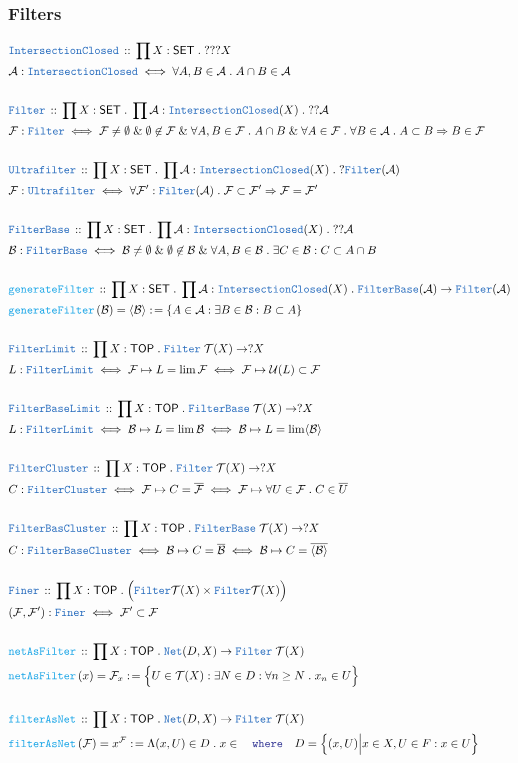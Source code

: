 \documentclass[12pt]{scrartcl}
\newcommand{\TYPE}[1]{\textcolor{NavyBlue}{\mathtt{#1}}}
\newcommand{\FUNC}[1]{\textcolor{Cerulean}{\mathtt{#1}}}
\newcommand{\LOGIC}[1]{\textcolor{Blue}{\mathtt{#1}}}
\renewcommand{\.}{\; . \;}
\newcommand{\de}{: \kern 0.1pc =}
\newcommand{\where}{\LOGIC{where}}
\newcommand{\Act}[1]{\left( #1 \right)}
\newcommand{\DeclareType}[2]{& \TYPE{#1} \, :: \, #2 \\}
\newcommand{\DefineType}[3]{& #1 : \TYPE{#2} \iff #3 \\}
\newcommand{\DefineNamedType}[4]{& #1 : \TYPE{#2} \iff #3 \iff #4 \\}
\newcommand{\DeclareFunc}[2]{& \FUNC{#1} \, :: \, #2 \\}
\newcommand{\DefineNamedFunc}[4]{&  \FUNC{#1}\Act{#2} = #3 \de #4 \\}
\newcommand{\Page}[1]{ \begin{align*} #1 \end{align*}   }
\renewcommand{\And}{\; \& \;}
\newcommand{\Imply}{\Rightarrow}
\newcommand{\A}{\mathcal{A}}
\newcommand{\B}{\mathcal{B}}
\newcommand{\SET}{\mathsf{SET}}
\newcommand{\TOP}{\mathsf{TOP}}
\newcommand{\T}{\mathcal{T}}
\renewcommand{\U}{\mathcal{U}}
\newcommand{\F}{\mathcal{F}}
\begin{document}
\subsubsection{Filters}
\Page{
	\DeclareType{IntersectionClosed}{\prod X : \SET \. ???X}
	\DefineType{\A}{IntersectionClosed}{\forall A,B \in \A \. A \cap B \in \A}
	\\
	\DeclareType{Filter}{\prod X : \SET \. \prod \A : \TYPE{IntersectionClosed}(X) \. ??\A}
	\DefineType{\F}{Filter}{
		\F \neq \emptyset \And 
		\emptyset \not\in \F \And 
		\forall A,B \in \F \. A \cap B \And
		\forall A \in \F \. \forall B \in \A \. A \subset B \Imply B \in \F
	}
	\\
	\DeclareType{Ultrafilter}{\prod X : \SET \. \prod \A : \TYPE{IntersectionClosed}(X) \. ?\TYPE{Filter}(\A)}
	\DefineType{\F}{Ultrafilter}{
		\forall \F' : \TYPE{Filter}(\A) \.  \F \subset \F'  \Imply \F = \F'
	}
	\\
	\DeclareType{FilterBase}{\prod X : \SET \. \prod \A : \TYPE{IntersectionClosed}(X) \. ??\A}
	\DefineType{\B}{FilterBase}{
		\B  \neq \emptyset \And \emptyset \not \in \B \And \forall A,B \in \B \. \exists C \in \B : C \subset A \cap B
	}
	\\
	\DeclareFunc{generateFilter}{ 
		\prod X : \SET \. 
		\prod \A : \TYPE{IntersectionClosed}(X) \. 
		\TYPE{FilterBase}(\A) \to \TYPE{Filter}(\A) 
	}
	\DefineNamedFunc{generateFilter}{\B }{\langle \B \rangle}
	{
		\{ A \in \A : \exists B \in \B : B \subset A \}
	}
	\\
	\DeclareType{FilterLimit}{\prod X : \TOP \. \TYPE{Filter}\;\T(X) \to ?X}
	\DefineNamedType{L}{FilterLimit}{\F \mapsto  L = \lim \F}
	{ \F \mapsto \U(L) \subset \F }
	\\
	\DeclareType{FilterBaseLimit}{\prod X : \TOP \. \TYPE{FilterBase}\;\T(X) \to ?X}
	\DefineNamedType{L}{FilterLimit}{\B \mapsto  L = \lim \B}
	{ \B \mapsto L = \lim \langle \B \rangle  }
	\\
	\DeclareType{FilterCluster}{\prod X : \TOP \. \TYPE{Filter}\;\T(X) \to ?X}
	\DefineNamedType{C}{FilterCluster}{\F \mapsto  C= \overline{\F}}
	{ \F \mapsto \forall U \in \F \. C \in \overline{U} }
	\\
	\DeclareType{FilterBasCluster}{\prod X : \TOP \. \TYPE{FilterBase}\;\T(X) \to ?X}
	\DefineNamedType{C}{FilterBaseCluster}{\B \mapsto  C = \overline{\B}}
	{ \B \mapsto C = \overline{\langle \B \rangle} }
	\\
	\DeclareType{Finer}{\prod X : \TOP \. \Big( \TYPE{Filter} \T(X) \times \TYPE{Filter} \T(X)  \Big)}
	\DefineType{(\F,\F')}{Finer}{\F' \subset \F}
	\\
	\DeclareFunc{netAsFilter}
	{
		\prod X : \TOP \. \TYPE{Net}(D,X) \to \TYPE{Filter}\; \T(X)
	}
	\DefineNamedFunc{netAsFilter}{x}{\F_x}
	{
		\Big\{  U \in \T(X) : \exists N \in D : \forall n \ge N \. x_n \in U  \Big\}
	} 
	\\
	\DeclareFunc{filterAsNet}
	{
		\prod X : \TOP \. \TYPE{Net}(D,X) \to \TYPE{Filter}\; \T(X)
	}
	\DefineNamedFunc{filterAsNet}{\F}{x^\F}
	{
		\Lambda (x,U) \in D \. x \in  
		\quad 
		\where 
		\quad
		D = \Big\{ (x,U) \Big| x \in X , U \in F : x \in U \Big\}
	} 
}
\end{document}
